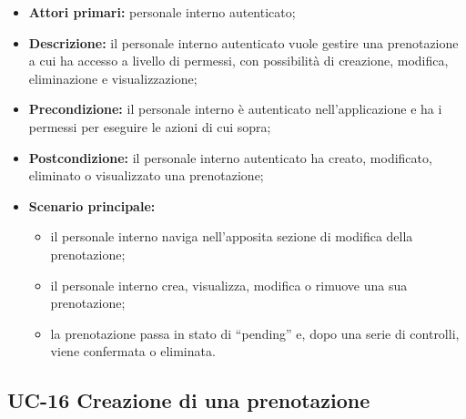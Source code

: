 \begin{itemize}
\item \textbf{Attori primari:} personale interno autenticato;
\item \textbf{Descrizione:} il personale interno autenticato vuole gestire una prenotazione a cui ha accesso a livello di permessi, con possibilità di creazione, modifica, eliminazione e visualizzazione;
\item \textbf{Precondizione:} il personale interno è autenticato nell’applicazione e ha i permessi per eseguire le azioni di cui sopra;
\item \textbf{Postcondizione:} il personale interno autenticato ha creato, modificato, eliminato o visualizzato una prenotazione;
\item \textbf{Scenario principale:} 
	\begin{itemize}
		\item il personale interno naviga nell’apposita sezione di modifica della prenotazione;
		\item il personale interno crea, visualizza, modifica o rimuove una sua prenotazione;
		\item la prenotazione passa in stato di “pending” e, dopo una serie di controlli, viene confermata o eliminata.
	\end{itemize}
\end{itemize}

\subsection{UC-16 Creazione di una prenotazione}

